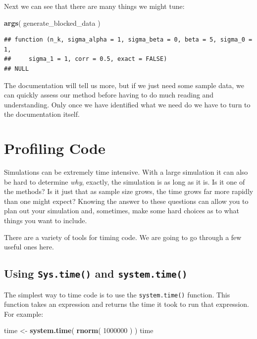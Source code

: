 \documentclass[
]{book}
\newenvironment{Shaded}{\begin{snugshade}}{\end{snugshade}}
\newcommand{\DecValTok}[1]{\textcolor[rgb]{0.00,0.00,0.81}{#1}}
\newcommand{\FunctionTok}[1]{\textcolor[rgb]{0.13,0.29,0.53}{\textbf{#1}}}
\newcommand{\NormalTok}[1]{#1}
\newcommand{\OtherTok}[1]{\textcolor[rgb]{0.56,0.35,0.01}{#1}}
\begin{document}
Next we can see that there are many things we might tune:

\begin{Shaded}
\begin{Highlighting}[]
\FunctionTok{args}\NormalTok{( generate\_blocked\_data )}
\end{Highlighting}
\end{Shaded}

\begin{verbatim}
## function (n_k, sigma_alpha = 1, sigma_beta = 0, beta = 5, sigma_0 = 1, 
##     sigma_1 = 1, corr = 0.5, exact = FALSE) 
## NULL
\end{verbatim}

The documentation will tell us more, but if we just need some sample data, we can quickly assess our method before having to do much reading and understanding.
Only once we have identified what we need do we have to turn to the documentation itself.

\section{Profiling Code}\label{profiling-code}

Simulations can be extremely time intensive.
With a large simulation it can also be hard to determine \emph{why}, exactly, the simulation is as long as it is.
Is it one of the methods?
Is it just that as sample size grows, the time grows far more rapidly than one might expect?
Knowing the answer to these questions can allow you to plan out your simulation and, sometimes, make some hard choices as to what things you want to include.

There are a variety of tools for timing code.
We are going to go through a few useful ones here.

\subsection{\texorpdfstring{Using \texttt{Sys.time()} and \texttt{system.time()}}{Using Sys.time() and system.time()}}\label{using-sys.time-and-system.time}

The simplest way to time code is to use the \texttt{system.time()} function.
This function takes an expression and returns the time it took to run that expression.
For example:

\begin{Shaded}
\begin{Highlighting}[]
\NormalTok{time }\OtherTok{\textless{}{-}} \FunctionTok{system.time}\NormalTok{( }\FunctionTok{rnorm}\NormalTok{( }\DecValTok{1000000}\NormalTok{ ) )}
\NormalTok{time}
\end{Highlighting}
\end{Shaded}
\end{document}
